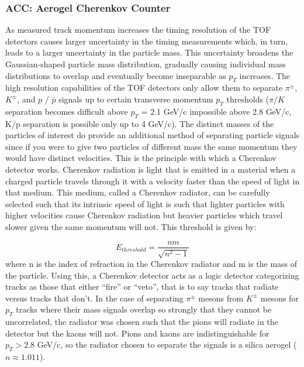 \subsubsection{ACC: Aerogel Cherenkov Counter}
As measured track momentum increases the timing resolution of the TOF detectors causes larger uncertainty in the timing measurements which, in turn, leads to a larger uncertainty in the particle mass. This uncertainty broadens the Gaussian-shaped particle mass distribution, gradually causing individual mass distributions to overlap and eventually become inseparable as $p_T$ increases. The high resolution capabilities of the TOF detectors only allow them to separate $\pi^{\pm}$, $K^{\pm}$, and $p$ / $\bar{p}$ signals up to certain transverse momentum $p_{T}$ thresholds ($\pi/K$ separation becomes difficult above $p_T$ = 2.1 GeV/c impossible above 2.8 GeV/c, K/p separation is possible only up to 4 GeV/c). The distinct masses of the particles of interest do provide an additional method of separating particle signals since if you were to give two particles of different mass the same momentum they would have distinct velocities. This is the principle with which a Cherenkov detector works. Cherenkov radiation is light that is emitted in a material when a charged particle travels through it with a velocity faster than the speed of light in that medium. This medium, called a Cherenkov radiator, can be carefully selected such that its intrinsic speed of light is such that lighter particles with higher velocities cause Cherenkov radiation but heavier particles which travel slower given the same momentum will not. This threshold is given by:

\begin{equation}
E_{threshold} = \frac{nm}{\sqrt{n^2-1}}
\end{equation}
where n is the index of refraction in the Cherenkov radiator and m is the mass of the particle.
Using this, a Cherenkov detector acts as a logic detector categorizing tracks as those that either ``fire'' or ``veto'', that is to say tracks that radiate versus tracks that don't. In the case of separating $\pi^{\pm}$ mesons from $K^{\pm}$ mesons for $p_{T}$ tracks where their mass signals overlap so strongly that they cannot be uncorrelated, the radiator was chosen such that the pions will radiate in the detector but the kaons will not. Pions and kaons are indistinguishable for $p_{T} > 2.8$ GeV/c, so the radiator chosen to separate the signals is a silica aerogel ($n \approx 1.011$).

